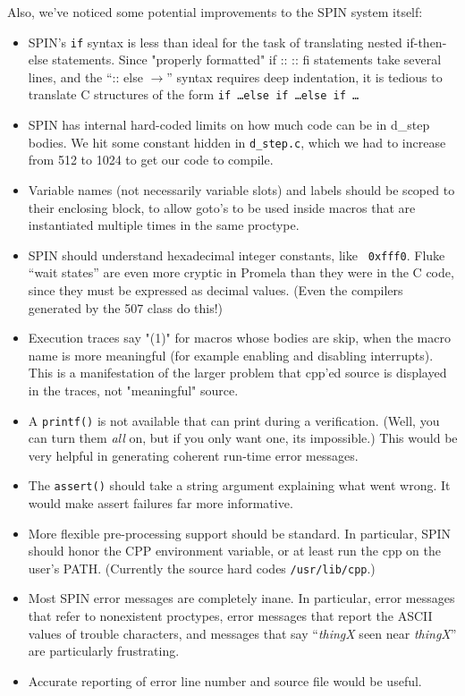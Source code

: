 Also, we've noticed some potential improvements to the SPIN system itself:

\begin{itemize}

\item
SPIN's {\tt if} syntax is less than ideal for the task of translating nested
if-then-else statements.  Since "properly formatted" if :: :: fi statements
take several lines, and the ``:: else $\rightarrow$''  syntax requires deep
indentation, it is tedious to translate C structures of the form
{\tt if \ldots else if \ldots else if \ldots }

\item
SPIN has internal hard-coded limits on how much code can be in d_step
bodies.  We hit some constant hidden in {\tt d_step.c}, which we had
to increase from 512 to 1024 to get our code to compile.

\item
Variable names (not necessarily variable slots) and labels should be
scoped to their enclosing block, to allow goto's to be used inside
macros that are instantiated multiple times in the same proctype.

\item
SPIN should understand hexadecimal integer constants, like {\tt
0xfff0}.  Fluke ``wait states'' are even more cryptic in Promela than
they were in the C code, since they must be expressed as decimal values.
(Even the compilers generated by the 507 class do this!)

\item
Execution traces say "(1)" for macros whose bodies are skip, when the
macro name is more meaningful (for example enabling and disabling
interrupts).  This is a manifestation of the larger problem that cpp'ed
source is displayed in the traces, not "meaningful" source.

\item
A {\tt printf()} is not available that can print during a
verification. (Well, you can turn them {\em all} on, but if
you only want one, its impossible.)  This would be very
helpful in generating coherent run-time error messages.

\item
The {\tt assert()} should take a string argument explaining what went wrong.
It would make assert failures far more informative.

\item
More flexible pre-processing support should be standard.  In particular,
SPIN should honor the CPP environment variable, or at least run the
cpp on the user's PATH. (Currently the source hard codes {\tt /usr/lib/cpp}.)

\item
Most SPIN error messages are completely inane.  In particular, error messages
that refer to nonexistent proctypes, error messages that report the ASCII
values of trouble characters, and messages that say ``{\em thingX} seen near
{\em thingX}'' are particularly frustrating.

\item
Accurate reporting of error line number and source file would be useful.


\end{itemize}

